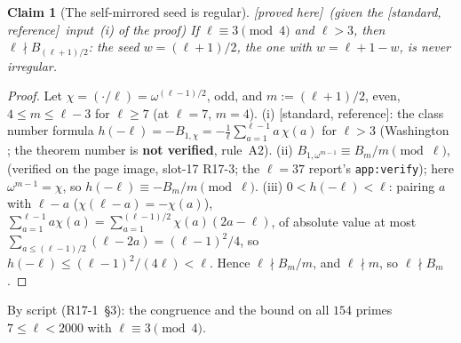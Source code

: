 \documentclass[11pt]{article}
\newtheorem{claim}[theorem]{Claim}
\theoremstyle{remark}
\newcommand{\PROVED}{\textsf{[proved here]}}
\newcommand{\STD}{\textsf{[standard, reference]}}
\begin{document}
\begin{claim}[The self-mirrored seed is regular]\label{cl:selfmirror}\PROVED\ (given the \STD\ input~(i) of the proof)
If $\ell\equiv3\pmod4$ and $\ell>3$, then $\ell\nmid B_{(\ell+1)/2}$: the seed $w=(\ell+1)/2$, the one with $w=\ell+1-w$, is never irregular.
\end{claim}
\begin{proof}
Let $\chi=(\cdot/\ell)=\omega^{(\ell-1)/2}$, odd, and $m:=(\ell+1)/2$, even, $4\le m\le\ell-3$ for $\ell\ge7$ (at $\ell=7$, $m=4$). (i) \STD: the class number
formula $h(-\ell)=-B_{1,\chi}=-\frac1\ell\sum_{a=1}^{\ell-1}a\,\chi(a)$ for $\ell>3$ (Washington \cite[Ch.~4]{washington}; the theorem number is \textbf{not
verified}, rule~A2). (ii) $B_{1,\omega^{m-1}}\equiv B_m/m\pmod\ell$, \cite[Cor.~5.15, p.~61]{washington1st} (verified on the page image, slot-17 R17-3; the
$\ell=37$ report's \texttt{app:verify}); here $\omega^{m-1}=\chi$, so $h(-\ell)\equiv-B_m/m\pmod\ell$. (iii) $0<h(-\ell)<\ell$: pairing $a$ with $\ell-a$
($\chi(\ell-a)=-\chi(a)$), $\sum_{a=1}^{\ell-1}a\chi(a)=\sum_{a=1}^{(\ell-1)/2}\chi(a)(2a-\ell)$, of absolute value at most $\sum_{a\le(\ell-1)/2}(\ell-2a)=(\ell-1)^{2}/4$,
so $h(-\ell)\le(\ell-1)^{2}/(4\ell)<\ell$. Hence $\ell\nmid B_m/m$, and $\ell\nmid m$, so $\ell\nmid B_m$.
\end{proof}
\noindent By script (R17-1~\S3): the congruence and the bound on all $154$ primes $7\le\ell<2000$ with $\ell\equiv3\pmod4$.
\end{document}
